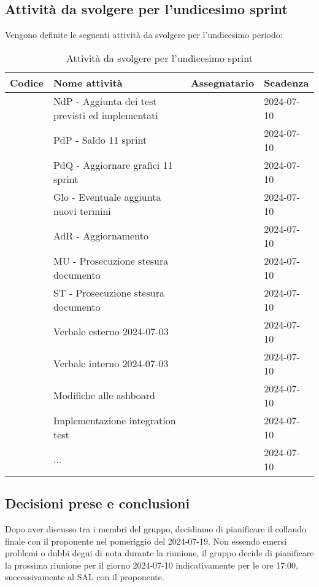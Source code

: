 \documentclass[italian,12pt]{article}
\begin{document}
\newpage
\subsection{Attività da svolgere per l'undicesimo sprint}
Vengono definite le seguenti attività da svolgere per l'undicesimo periodo:
\begin{table}[!h]
	\centering
	\begin{tabular}{ |l||p{7cm}|l|l| }
		\hline
		\textbf{Codice}          & \textbf{Nome attività}                           & \textbf{Assegnatario} & \textbf{Scadenza} \\
		\hline
		\mySkip[]       & NdP - Aggiunta dei test previsti ed implementati &  & 2024-07-10        \\
		\mySkip[]       & PdP - Saldo 11 sprint                            &  & 2024-07-10        \\
		\mySkip[]       & PdQ - Aggiornare grafici 11 sprint               &  & 2024-07-10        \\
		\mySkip[]       & Glo - Eventuale aggiunta nuovi termini           &  & 2024-07-10        \\
		\mySkip[]       & AdR - Aggiornamento                              &  & 2024-07-10        \\
		\mySkip[]       & MU - Prosecuzione stesura documento              &  & 2024-07-10        \\
		\mySkip[]       & ST - Prosecuzione stesura documento              &  & 2024-07-10        \\
		\mySkip[]       & Verbale esterno 2024-07-03                       &  & 2024-07-10        \\
		\mySkip[]       & Verbale interno 2024-07-03                       &  & 2024-07-10        \\
		\mySkip[]       & Modifiche alle ashboard                          &  & 2024-07-10        \\
		\mySkip[]       & Implementazione integration test                 &  & 2024-07-10        \\
		\mySkip[]       & ...                                              &  & 2024-07-10        \\
		\hline
	\end{tabular}
	\caption{Attività da svolgere per l'undicesimo sprint}
\end{table}

\subsection{Decisioni prese e conclusioni}
Dopo aver discusso tra i membri del gruppo, decidiamo di pianificare il collaudo finale con il proponente nel pomeriggio del 2024-07-19.
Non essendo emersi problemi o dubbi degni di nota durante la riunione, il gruppo decide di pianificare la prossima riunione per il giorno 2024-07-10 indicativamente per le ore 17:00, successivamente al SAL con il proponente.
\end{document}
